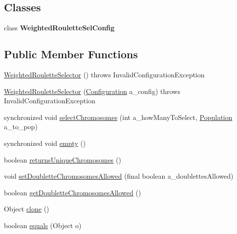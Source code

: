 \subsection*{Classes}
\begin{DoxyCompactItemize}
\item 
class {\bfseries Weighted\-Roulette\-Sel\-Config}
\end{DoxyCompactItemize}
\subsection*{Public Member Functions}
\begin{DoxyCompactItemize}
\item 
\hyperlink{classorg_1_1jgap_1_1impl_1_1_weighted_roulette_selector_ad344e96dc51c77d065e55aebb0b93882}{Weighted\-Roulette\-Selector} ()  throws Invalid\-Configuration\-Exception 
\item 
\hyperlink{classorg_1_1jgap_1_1impl_1_1_weighted_roulette_selector_af7ea72c2cd321272658318051d800d38}{Weighted\-Roulette\-Selector} (\hyperlink{classorg_1_1jgap_1_1_configuration}{Configuration} a\-\_\-config)  throws Invalid\-Configuration\-Exception 
\item 
synchronized void \hyperlink{classorg_1_1jgap_1_1impl_1_1_weighted_roulette_selector_a8d501289de36fcd27de2352ce8f6404a}{select\-Chromosomes} (int a\-\_\-how\-Many\-To\-Select, \hyperlink{classorg_1_1jgap_1_1_population}{Population} a\-\_\-to\-\_\-pop)
\item 
synchronized void \hyperlink{classorg_1_1jgap_1_1impl_1_1_weighted_roulette_selector_a22f11caa1cdab23d1e61144bdcd70798}{empty} ()
\item 
boolean \hyperlink{classorg_1_1jgap_1_1impl_1_1_weighted_roulette_selector_a077b4c36589db7f0a9eee47a0c281017}{returns\-Unique\-Chromosomes} ()
\item 
void \hyperlink{classorg_1_1jgap_1_1impl_1_1_weighted_roulette_selector_a48b8de4edf53d90dcfb9cb11d6e6ded2}{set\-Doublette\-Chromosomes\-Allowed} (final boolean a\-\_\-doublettes\-Allowed)
\item 
boolean \hyperlink{classorg_1_1jgap_1_1impl_1_1_weighted_roulette_selector_af508701fcc8e9cce41f6f68b674dee65}{get\-Doublette\-Chromosomes\-Allowed} ()
\item 
Object \hyperlink{classorg_1_1jgap_1_1impl_1_1_weighted_roulette_selector_a6d11f3e1551fbee391ce80e3d643b14e}{clone} ()
\item 
boolean \hyperlink{classorg_1_1jgap_1_1impl_1_1_weighted_roulette_selector_a0274429675772b2b81fb162b2914a946}{equals} (Object o)
\end{DoxyCompactItemize}
